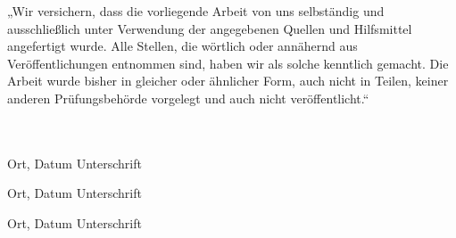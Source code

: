 \documentclass[12pt,toc=bib,toc=listof]{scrreprt}
\newcommand{\studentnameA}{Suphi Pembe}
\newcommand{\studentpartA}{SEITEN oder KAPITEL VON BIS 1}
\newcommand{\studentnameB}{Andreas Würzer}
\newcommand{\studentpartB}{SEITEN oder KAPITEL VON BIS 2}
\newcommand{\studentnameC}{Christian Nguyen}
\newcommand{\studentpartC}{SEITEN oder KAPITEL VON BIS 3}
\begin{document}
\newpage

\printbibliography[heading=head]



\newpage

\label{sec:erklaerung}

„Wir versichern, dass die vorliegende Arbeit von uns selbständig und ausschließlich unter Verwendung der angegebenen Quellen und Hilfsmittel angefertigt wurde. Alle Stellen, die wörtlich oder annähernd aus Veröffentlichungen entnommen sind, haben wir als solche kenntlich gemacht. Die Arbeit wurde bisher in gleicher oder ähnlicher Form, auch nicht in Teilen, keiner anderen Prüfungsbehörde vorgelegt und auch nicht veröffentlicht.“

\vspace{1cm}
\noindent
\\
\\

\vspace{3cm}
Ort, Datum \hfill Unterschrift

\vspace{2cm}
Ort, Datum \hfill Unterschrift

\vspace{2cm}
Ort, Datum \hfill Unterschrift
\end{document}
